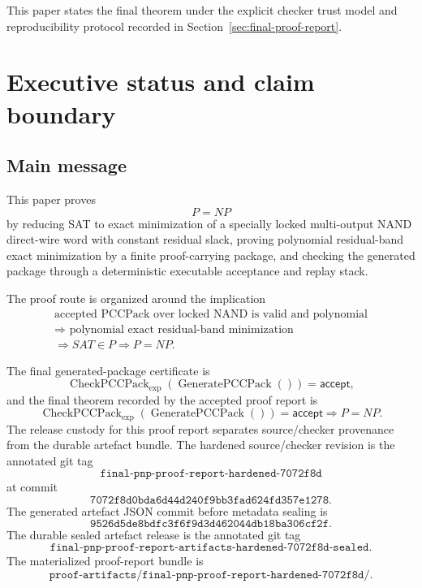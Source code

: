 \documentclass[10.5pt,a4paper]{article}
\newcommand{\CheckPack}{\operatorname{CheckPCCPack}_{\exp}}
\newcommand{\GenPack}{\operatorname{GeneratePCCPack}}
\begin{document}
\begin{titlepage}
\begin{minipage}{0.88\textwidth}
\end{minipage}
\vfill
{\small This paper states the final theorem under the explicit checker trust model and reproducibility protocol recorded in Section~\ref{sec:final-proof-report}.}\par
\end{titlepage}

\tableofcontents
\newpage

\section{Executive status and claim boundary}

\subsection{Main message}
This paper proves
\[
P=NP
\]
by reducing SAT to exact minimization of a specially locked multi-output NAND direct-wire word with constant residual slack, proving polynomial residual-band exact minimization by a finite proof-carrying package, and checking the generated package through a deterministic executable acceptance and replay stack.

The proof route is organized around the implication
\[
\begin{gathered}
\text{accepted PCCPack over locked NAND is valid and polynomial}\\
\Longrightarrow\text{ polynomial exact residual-band minimization}\\
\Longrightarrow SAT\in P\Longrightarrow P=NP.
\end{gathered}
\]

The final generated-package certificate is
\[
\CheckPack(\GenPack())=\mathsf{accept},
\]
and the final theorem recorded by the accepted proof report is
\[
\CheckPack(\GenPack())=\mathsf{accept}\Longrightarrow P=NP.
\]
The release custody for this proof report separates source/checker provenance from the durable artefact bundle.  The hardened source/checker revision is the annotated git tag
\[
\texttt{final-pnp-proof-report-hardened-7072f8d}
\]
at commit
\[
\texttt{7072f8d0bda6d44d240f9bb3fad624fd357e1278}.
\]
The generated artefact JSON commit before metadata sealing is
\[
\texttt{9526d5de8bdfc3f6f9d3d462044db18ba306cf2f}.
\]
The durable sealed artefact release is the annotated git tag
\[
\texttt{final-pnp-proof-report-artifacts-hardened-7072f8d-sealed}.
\]
The materialized proof-report bundle is
\[
\texttt{proof-artifacts/final-pnp-proof-report-hardened-7072f8d/}.
\]
\end{document}
